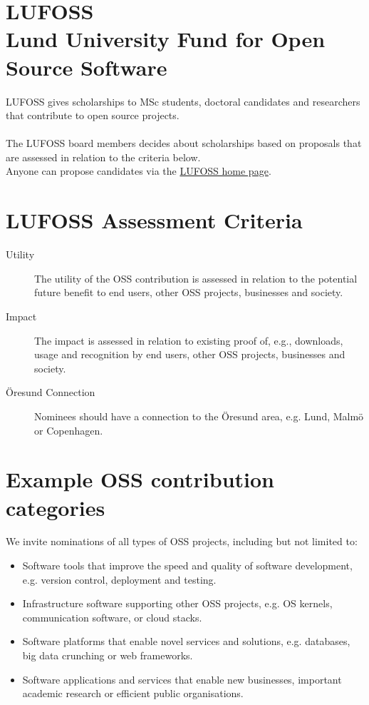 \documentclass[a4paper,oneside]{report}
\begin{document}
\Large
\section*{LUFOSS\\Lund University Fund for Open Source Software}
LUFOSS gives scholarships to MSc students, doctoral candidates and researchers that contribute to open source projects. 
\\ \\The LUFOSS board members decides about scholarships based on proposals that are assessed in relation to the criteria below. \\Anyone can propose candidates via the \href{https://github.com/bjornregnell/lufoss}{LUFOSS home page}. 

\section*{LUFOSS Assessment Criteria}
\begin{description}
\item[Utility] The utility of the OSS contribution is assessed in relation to the potential future benefit to end users, other OSS projects, businesses and society.
\item[Impact] The impact is assessed in relation to existing proof of, e.g., downloads, usage and recognition by end users, other OSS projects, businesses and society.  
\item[Öresund Connection] Nominees should have a connection to the Öresund area, e.g. Lund, Malmö or Copenhagen.
\end{description}

\section*{Example OSS contribution categories}
We invite nominations of all types of OSS projects, including but not limited to:
\begin{itemize}
\item Software tools that improve the speed and quality of software development, e.g. version control,  deployment and testing.
\item Infrastructure software supporting other OSS projects, e.g. OS kernels, communication software, or cloud stacks.
\item Software platforms that enable novel services and solutions, e.g. databases, big data crunching or web frameworks.
\item Software applications and services that enable new businesses, important academic research or efficient public organisations. 
\end{itemize} 
\end{document}
